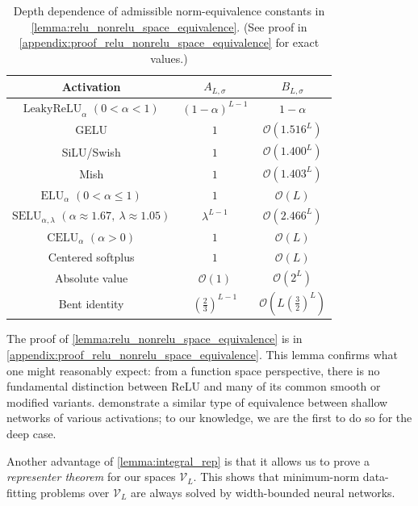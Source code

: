 \documentclass{article}
\def\cO{{\mathcal{O}}}
\def\cV{{\mathcal{V}}}
\begin{document}
\begin{table}
\centering
\begingroup
\setlength{\tabcolsep}{6pt}
\begin{tabular}{c|c|c}
\hline
\textbf{Activation}
& \textbf{ $A_{L,\sigma}$}
& \textbf{$B_{L,\sigma}$}
\tabularnewline[1pt]
\hline
\rule{0pt}{2.6ex}
$\mathrm{LeakyReLU}_\alpha$ $(0<\alpha<1)$
& $(1-\alpha)^{L-1}$
& $1-\alpha$ 
\tabularnewline[1pt]

GELU
& $1$
& $\cO(1.516^L)$
\tabularnewline[1pt]

SiLU/Swish
& $1$
& $\cO(1.400^L)$
\tabularnewline[1pt]

Mish
& $1$
& $\cO(1.403^L)$
\tabularnewline[1pt]

$\mathrm{ELU}_\alpha$ $(0<\alpha\leq1)$
& $1$
& $\cO(L)$
\tabularnewline[1pt]

$\mathrm{SELU}_{\alpha,\lambda}$
$(\alpha\approx1.67,\ \lambda\approx1.05)$
& $\lambda^{L-1}$
& $\cO(2.466^L)$
\tabularnewline[1pt]

$\mathrm{CELU}_\alpha$ $(\alpha>0)$
& $1$
& $\cO(L)$
\tabularnewline[1pt]

Centered softplus
& $1$
& $\cO(L)$
\tabularnewline[1pt]

Absolute value
& $\cO(1)$
& $\cO(2^L)$
\tabularnewline[1pt]

Bent identity
& $\left(\frac{2}{3}\right)^{L-1}$
& $\cO \left(L\left(\frac{3}{2}\right)^L\right)$
\tabularnewline[2pt]
\hline
\end{tabular}
\endgroup
\caption{Depth dependence of admissible norm-equivalence constants in
\cref{lemma:relu_nonrelu_space_equivalence}. (See proof in \cref{appendix:proof_relu_nonrelu_space_equivalence} for exact values.)}
\label{tab:activation_equivalence_constants}
\end{table}





The proof of \cref{lemma:relu_nonrelu_space_equivalence} is in \cref{appendix:proof_relu_nonrelu_space_equivalence}. This lemma confirms what one might reasonably expect: from a function space perspective, there is no fundamental distinction between ReLU and many of its common smooth or modified variants. \cite{heeringa2024embeddings} demonstrate a similar type of equivalence between shallow networks of various activations; to our knowledge, we are the first to do so for the deep case.

Another advantage of \cref{lemma:integral_rep} is that it allows us to prove a \textit{representer theorem} for our spaces $\cV_L$. This shows that minimum-norm data-fitting problems over $\cV_L$ are always solved by width-bounded neural networks.
\end{document}
